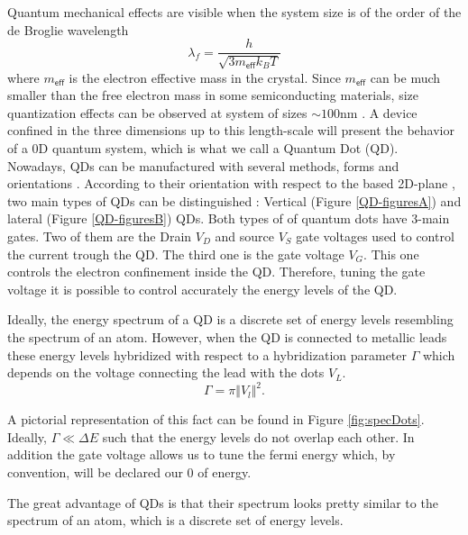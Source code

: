 Quantum mechanical effects are visible when the system size is of the order of the de Broglie wavelength \citep[(1.1)]{bimberg_quantum_1999}
\[
\lambda_{f}=\frac{h}{\sqrt{3m_{\mathsf{eff}}k_{B}T}}
\]
 where $m_{\mathsf{eff}}$ is the electron effective mass in the crystal.
Since $m_{\mathsf{eff}}$ can be much smaller than the free electron mass in some semiconducting materials, size quantization effects can be observed at system of sizes $\sim100\mbox{nm}$ \citep[2.1]{sindel_numerical_2005}. A device confined in the three dimensions up to this length-scale will present the behavior of a $0$D quantum system, which is what we call a Quantum Dot (QD).\\

Nowadays, QDs can be manufactured with several methods, forms and orientations \citep{bimberg_quantum_1999}. According to their orientation with respect to the based 2D-plane , two main types of QDs can be distinguished : Vertical (Figure \ref{QD-figuresA}) and lateral (Figure \ref{QD-figuresB}) QDs. Both types of of quantum dots have $3$-main gates. Two of them are the Drain $V_D$ and source $V_S$ gate voltages used to control the current trough the QD. The third one is the gate voltage $V_G$. This one controls the electron confinement inside the QD. Therefore, tuning the gate voltage it is possible to control accurately the energy levels of the QD. 





Ideally, the energy spectrum of a QD is a discrete set of energy levels resembling the spectrum of an atom. However, when the QD is connected to metallic leads these energy levels hybridized with respect to a hybridization parameter $\Gamma$ which depends on the voltage connecting the lead with the dots $V_L$.
\begin{equation}
    \Gamma = \pi \Vert V_l \Vert^2. 
\end{equation}

A pictorial representation of this fact can be found in Figure \ref{fig:specDots}. Ideally, $\Gamma \ll \Delta E$ such that the energy levels do not overlap each other. In addition the gate voltage allows us to tune the fermi energy which, by convention, will be declared our $0$ of energy. 


The great advantage of QDs is that their spectrum looks pretty similar
to the spectrum of an atom, which is a discrete set of energy levels.

